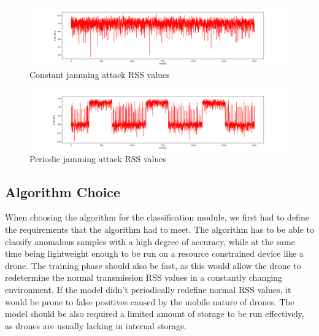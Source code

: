 \documentclass[futureinternet,article,submit,pdftex,moreauthors]{Definitions/mdpi}
\begin{document}
\begin{figure}[H]
	\includegraphics[width=10.5 cm]{img/ConstantJammingSignal.png}
	\caption{Constant jamming attack RSS values}
	\label{fig:ConstantJammingSignal}
\end{figure}   
\unskip
\begin{figure}[H]
	\includegraphics[width=10.5 cm]{img/PeriodicJammingSignal.png}
	\caption{Periodic jamming attack RSS values}
	\label{fig:PeriodicJammingSignal}
\end{figure}   
\unskip

\subsection {Algorithm Choice}

When choosing the algorithm for the classification module, we first had to define the requirements that the algorithm had to meet. The algorithm has to be able to classify anomalous samples with a high degree of accuracy, while at the same time 
being lightweight enough to be run on a resource constrained device like a drone. The training phase should also be fast, as this would allow the drone to redetermine the normal transmission RSS values in a constantly changing environment. If the model didn't periodically redefine normal RSS values, 
it would be prone to false positives caused by the mobile nature of drones. 
The model should be also required a limited amount of storage to be run effectively, as drones are usually lacking in internal storage. 
\end{document}
